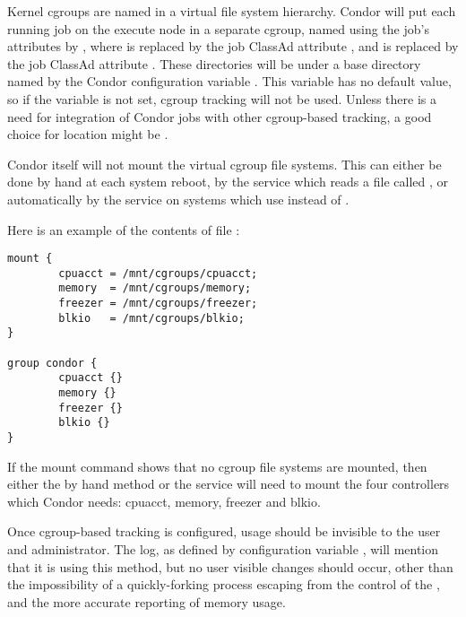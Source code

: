 Kernel cgroups are named in a virtual file system hierarchy. 
Condor will put each
running job on the execute node in a separate cgroup, 
named using the job's attributes by ,
where  is replaced by 
the job ClassAd attribute ,
and  is replaced by 
the job ClassAd attribute .
These directories will be under a base directory named 
by the Condor configuration variable .  
This variable has no default value, so if the variable is not set,
cgroup tracking will not be used.  
Unless there is a need for integration of Condor jobs with other
cgroup-based tracking, 
a good choice for  location might be . 

Condor itself will not mount the virtual cgroup file systems.  
This can either be done by hand at each system reboot, 
by the  service 
which reads a file called , 
or automatically by the  service 
on systems which use  instead of .

Here is an example of the contents of file :

\begin{verbatim}
mount {
        cpuacct = /mnt/cgroups/cpuacct;
        memory  = /mnt/cgroups/memory;
        freezer = /mnt/cgroups/freezer;
        blkio   = /mnt/cgroups/blkio;
}

group condor {
        cpuacct {}
        memory {}
        freezer {}
        blkio {}
}
\end{verbatim}

If the mount command shows that no cgroup file systems are mounted, 
then either the by hand method or the  service 
will need to mount the four controllers which Condor needs:
cpuacct, memory, freezer and blkio.  

Once cgroup-based tracking is configured, 
usage should be invisible to the user and administrator.  
The  log, as defined by configuration variable
, 
will mention that it is using this method, 
but no user visible changes should occur,
other than the impossibility of a quickly-forking process escaping from the
control of the ,
and the more accurate reporting of memory usage.
